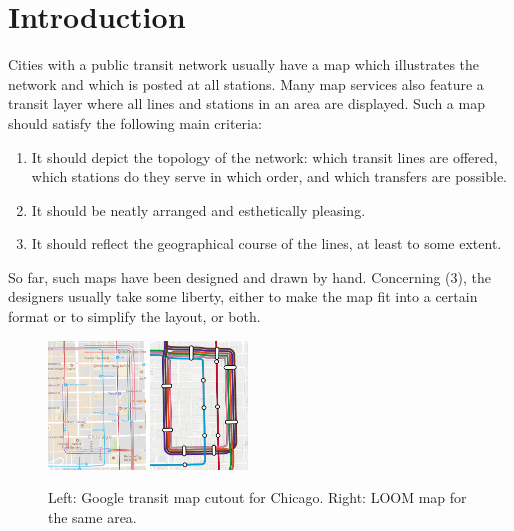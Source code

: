 \documentclass[sigconf]{acmart}
\begin{document}
\def\UrlFont{\normalsize}
\maketitle
{}
\section{Introduction}\label{SEC:intro}
%


Cities with a public transit network usually have a map which illustrates the network and which is posted at all stations. Many map services also feature a transit layer where all lines and stations in an area are displayed.
Such a map should satisfy the following main criteria:\vspace{0pt}

\begin{enumerate}[parsep=0.5mm, wide, labelwidth=0mm, itemindent=2.3mm]
  \setlength\itemsep{0pt}
\item  It should depict the topology of the network: which transit lines are offered, which stations do they serve in which order, and which transfers are possible.
\item It should be neatly arranged and esthetically pleasing.
\item It should reflect the geographical course of the lines, at least to some extent.
\end{enumerate}

\smallskip\noindent
So far, such maps have been designed and drawn by hand.
Concerning (3), the designers usually take some liberty, either to make the map fit into a certain format or to simplify the layout, or both.
\begin{figure}[ht]
\centering
\vspace{1em}
\includegraphics[width=0.23\textwidth]{google.pdf}
\hfill
\includegraphics[width=0.23\textwidth]{loom.pdf}
\caption{Left: Google transit map cutout for Chicago. Right: LOOM map for the same area.}
\vspace{-1em}
\end{figure}
\end{document}
